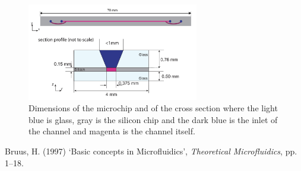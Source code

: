 \documentclass[twoside,twocolumn,9pt,a4paper]{IEEEtran}
\begin{document}
\begin{figure}[h]
\begin{center}
\includegraphics[width=7.5cm]{Images/Updated_figure1.png} %
\caption{Dimensions of the microchip and of the cross section where the light blue is glass, gray is the silicon chip and the dark blue is the inlet of the channel and magenta is the channel itself. }
\label{DimensionMicrochip}
\end{center}
\end{figure} %

\newpage
\begin{thebibliography}{99} %

 Bruus, H. (1997) ‘Basic concepts in Microfluidics’, \textit{Theoretical Microfluidics}, pp. 1–18.

\end{thebibliography}
\end{document}
